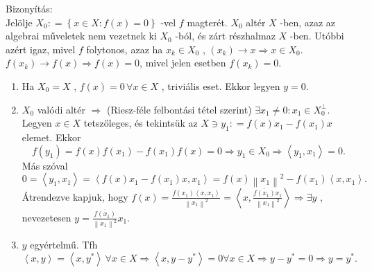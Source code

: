 \documentclass[12pt,a4paper]{scrartcl}
\providecommand{\tightlist}{%
  \setlength{\itemsep}{0pt}\setlength{\parskip}{0pt}}
\newenvironment{bizonyitas}{}{}
\begin{document}
\begin{bizonyitas}

Bizonyítás:\\
Jelölje \(X_{0}: = \left\{ {x \in X:f\left( x \right) = 0} \right\}\)
-vel \(f\) magterét. \(X_{0}\) altér \(X\) -ben, azaz az algebrai
műveletek nem vezetnek ki \(X_{0}\) -ból, és zárt részhalmaz \(X\) -ben.
Utóbbi azért igaz, mivel \(f\) folytonos, azaz ha \(x_{k} \in X_{0}\) ,
\(\left. \left( x_{k} \right)\rightarrow x\Rightarrow x \in X_{0} \right.\).
\(\left. f\left( x_{k} \right)\rightarrow f\left( x \right)\Rightarrow f\left( x \right) = 0 \right.\),
mivel jelen esetben \(f\left( x_{k} \right) = 0\).

\begin{enumerate}
\def\labelenumi{\arabic{enumi}.}
\tightlist
\item
  Ha \(X_{0} = X\) , \(f\left( x \right) = 0\,\forall x \in X\) ,
  triviális eset. Ekkor legyen \(y = 0\).
\item
  \(X_{0}\) valódi altér \(\Rightarrow\) (Riesz-féle felbontási tétel
  szerint) \(\exists x_{1} \neq 0:x_{1} \in X_{0}^{\bot}\). Legyen
  \(x \in X\) tetszőleges, és tekintsük az
  \(X \ni y_{1}: = f\left( x \right)x_{1} - f\left( x_{1} \right)x\)
  elemet. Ekkor
  \[\left. f\left( y_{1} \right) = f\left( x \right)f\left( x_{1} \right) - f\left( x_{1} \right)f\left( x \right) = 0\Rightarrow y_{1} \in X_{0}\Rightarrow\left\langle {y_{1},x_{1}} \right\rangle = 0. \right.\]
  Más szóval
  \[0 = \left\langle {y_{1},x_{1}} \right\rangle = \left\langle {f\left( x \right)x_{1} - f\left( x_{1} \right)x,x_{1}} \right\rangle = f\left( x \right)\left\| x_{1} \right\|^{2} - f\left( x_{1} \right)\left\langle {x,x_{1}} \right\rangle.\]
  Átrendezve kapjuk, hogy
  \(\left. f\left( x \right) = \frac{f\left( x_{1} \right)\left\langle {x,x_{1}} \right\rangle}{\left\| x_{1} \right\|^{2}} = \left\langle {x,\frac{\overline{f\left( x_{1} \right)}x_{1}}{\left\| x_{1} \right\|^{2}}} \right\rangle\Rightarrow\exists y \right.\)
  , nevezetesen
  \(y = \frac{\overline{f\left( x_{1} \right)}}{\left\| x_{1} \right\|^{2}}x_{1}\).
\item
  \(y\) egyértelmű. Tfh
  \[\left. \left\langle {x,y} \right\rangle = \left\langle {x,y^{*}} \right\rangle\,\forall x \in X\Rightarrow\left\langle {x,y - y^{*}} \right\rangle = 0\forall x \in X\Rightarrow y - y^{*} = 0\Rightarrow y = y^{*}. \right.\]
\end{enumerate}

\end{bizonyitas}
\end{document}
